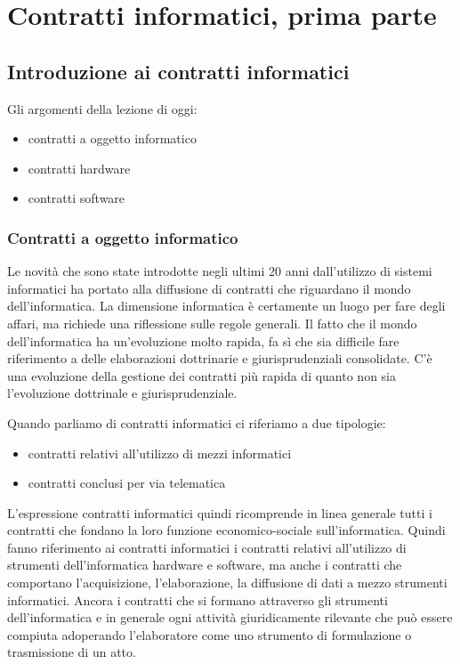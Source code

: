 \chapter{Contratti informatici, prima parte}

\section{Introduzione ai contratti informatici}
Gli argomenti della lezione di oggi:

\begin{itemize}
    \item contratti a oggetto informatico
    \item contratti hardware
    \item contratti software
\end{itemize}

\subsection{Contratti a oggetto informatico}
Le novità che sono state introdotte negli ultimi 20 anni dall'utilizzo di sistemi informatici ha portato alla diffusione di contratti che riguardano il mondo dell'informatica. La dimensione informatica è certamente un luogo per fare degli affari, ma richiede una riflessione sulle regole generali. Il fatto che il mondo dell'informatica ha un'evoluzione molto rapida, fa sì che sia difficile fare riferimento a delle elaborazioni dottrinarie e giurisprudenziali consolidate. C'è una evoluzione della gestione dei contratti più rapida di quanto non sia l'evoluzione dottrinale e giurisprudenziale. 

Quando parliamo di contratti informatici ci riferiamo a due tipologie:

\begin{itemize}
    \item contratti relativi all'utilizzo di mezzi informatici
    \item contratti conclusi per via telematica 
\end{itemize}

L'espressione contratti informatici quindi ricomprende in linea generale tutti i contratti che fondano la loro funzione economico-sociale sull'informatica. Quindi fanno riferimento ai contratti informatici i contratti relativi all'utilizzo di strumenti dell'informatica hardware e software, ma anche i contratti che comportano l'acquisizione, l'elaborazione, la diffusione di dati a mezzo strumenti informatici. Ancora i contratti che si formano attraverso gli strumenti dell'informatica e in generale ogni attività giuridicamente rilevante che può essere compiuta adoperando l'elaboratore come uno strumento di formulazione o trasmissione di un atto. 

